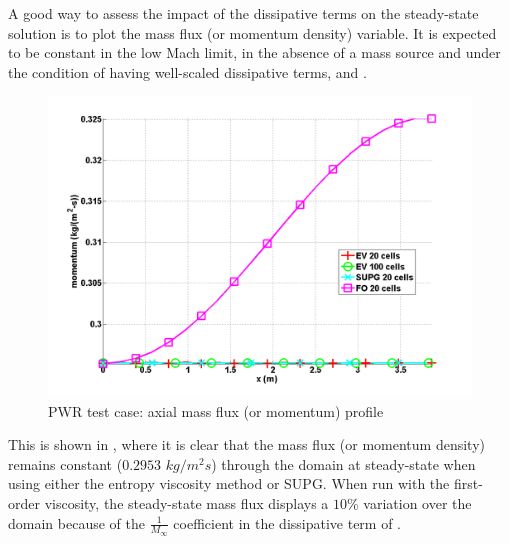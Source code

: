 A good way to assess the impact of the dissipative terms on the steady-state solution is to plot the mass flux (or momentum density) variable. It is expected to be constant in the low Mach limit, in the absence of a mass source and under the condition of having well-scaled dissipative terms,  and .
%
\begin{figure}[H]
\centering
\includegraphics[width=\textwidth]{figures/PWR_stt_momentum.png}
\caption{PWR test case: axial mass flux (or momentum) profile}
\label{fig:Momentum}
\end{figure}
%
This is shown in , where it is clear that the mass flux (or momentum density) remains constant ($0.2953$ $kg/m^2s$) through the domain at steady-state when using either the entropy viscosity method or SUPG. When run with the first-order viscosity, the steady-state mass flux displays a $10\%$ variation over the domain because of the $\frac{1}{M_\infty}$ coefficient in the dissipative term of .
%
